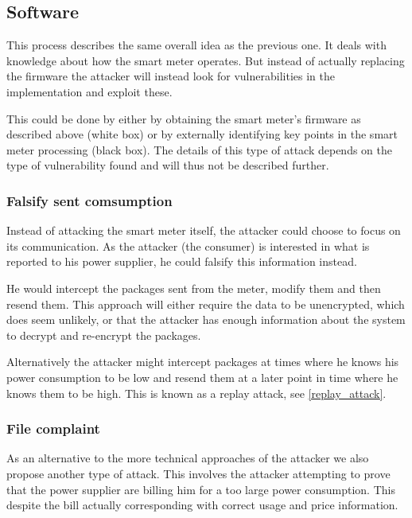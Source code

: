 \subsection{Software}
This process describes the same overall idea as the previous one.
It deals with knowledge about how the smart meter operates.
But instead of actually replacing the firmware the attacker will instead look for vulnerabilities in the implementation and exploit these.

This could be done by either by obtaining the smart meter's firmware as described above (white box) or by externally identifying key points in the smart meter processing (black box).
The details of this type of attack depends on the type of vulnerability found and will thus not be described further.

\subsubsection{Falsify sent comsumption}
Instead of attacking the smart meter itself, the attacker could choose to focus on its communication.
As the attacker (the consumer) is interested in what is reported to his power supplier, he could falsify this information instead.

He would intercept the packages sent from the meter, modify them and then resend them.
This approach will either require the data to be unencrypted, which does seem unlikely, or that the attacker has enough information about the system to decrypt and re-encrypt the packages.

Alternatively the attacker might intercept packages at times where he knows his power consumption to be low and resend them at a later point in time where he knows them to be high.
This is known as a replay attack, see \cref{replay_attack}.

\subsubsection{File complaint}
As an alternative to the more technical approaches of the attacker we also propose another type of attack.
This involves the attacker attempting to prove that the power supplier are billing him for a too large power consumption.
This despite the bill actually corresponding with correct usage and price information.

